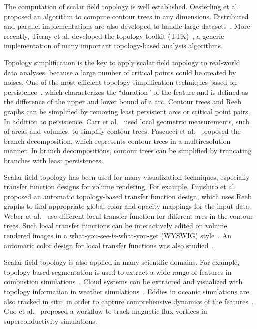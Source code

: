 The computation of scalar field topology is well established.  Oesterling et al.~\cite{OesterlingHWMS17} proposed an algorithm to compute contour trees in any dimensions.  Distributed and parallel implementations are also developed to handle large datasets~\cite{MorozovW13}.  More recently, Tierny et al. developed the topology toolkit (TTK)~\cite{TiernyFLGM18}, a generic implementation of many important topology-based analysis algorithms.  

Topology simplification is the key to apply scalar field topology to real-world data analyses, because a large number of critical points could be created by noises.  One of the most efficient topology simplification techniques based on persistence~\cite{EdelsbrunnerLZ02}, which characterizes the ``duration'' of the feature and is defined as the difference of the upper and lower bound of a arc.  Contour trees and Reeb graphs can be simplified by removing least persistent arcs or critical point pairs.  
In addition to persistence, Carr et al.~\cite{CarrSP04} used local geometric measurements, such of areas and volumes, to simplify contour trees.  Pascucci et al.~\cite{Pascucci2004} proposed the branch decomposition, which represents contour trees in a multiresolution manner.  In branch decompositions, contour trees can be simplified by truncating branches with least persistences.  

Scalar field topology has been used for many visualization techniques, especially transfer function designs for volume rendering.  For example, Fujishiro et al.~\cite{FujishiroAT99} proposed an automatic topology-based transfer function design, which uses Reeb graphs to find appropriate global color and opacity mappings for the input data.  Weber et al.~\cite{WeberDCPH07} use different local transfer function for different arcs in the contour trees.  Such local transfer functions can be interactively edited on volume rendered images in a what-you-see-is-what-you-get (WYSWIG) style~\cite{GuoY13}.  An automatic color design for local transfer functions was also studied~\cite{ZhouT09}.  

Scalar field topology is also applied in many scientific domains.  For example, topology-based segmentation is used to extract a wide range of features in combustion simulations~\cite{LandgePGBKCB14}.  Cloud systems can be extracted and visualized with topology information in weather simulations~\cite{DoraiswamyNN13}.  Eddies in oceanic simulations are also tracked in situ, in order to capture comprehensive dynamics of the features~\cite{WoodringPSPAH16}.  Guo et al.~\cite{GuoPG17} proposed a workflow to track magnetic flux vortices in superconductivity simulations.  

